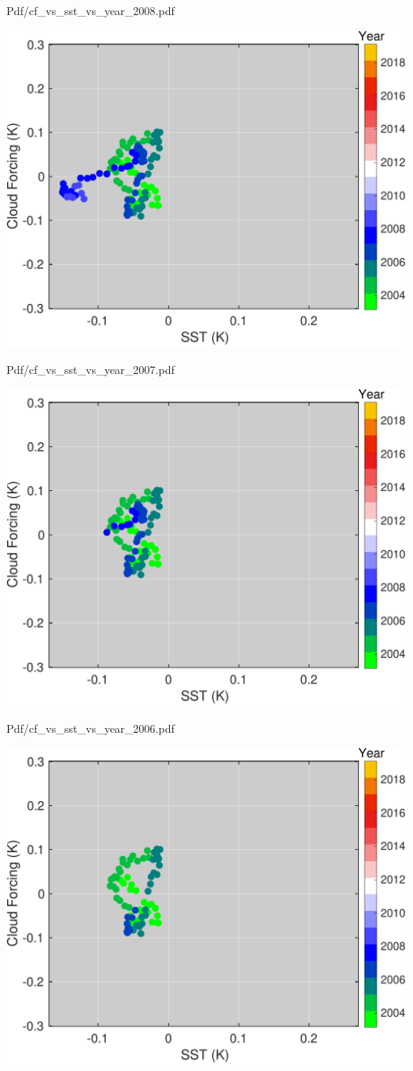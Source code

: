 \documentclass[presentation]{beamer}
\begin{document}
\begin{frame}[label={sec:org86aec36}]{Pdf/cf\_vs\_sst\_vs\_year\_2008.pdf}
\begin{center}
\includegraphics[width=0.7\linewidth]{./Figs/Pdf/cf_vs_sst_vs_year_2008.pdf}
\end{center}
\end{frame}

\begin{frame}[label={sec:orgf3c77e4}]{Pdf/cf\_vs\_sst\_vs\_year\_2007.pdf}
\begin{center}
\includegraphics[width=0.7\linewidth]{./Figs/Pdf/cf_vs_sst_vs_year_2007.pdf}
\end{center}
\end{frame}

\begin{frame}[label={sec:org736fb9f}]{Pdf/cf\_vs\_sst\_vs\_year\_2006.pdf}
\begin{center}
\includegraphics[width=0.7\linewidth]{./Figs/Pdf/cf_vs_sst_vs_year_2006.pdf}
\end{center}
\end{frame}
\end{document}
